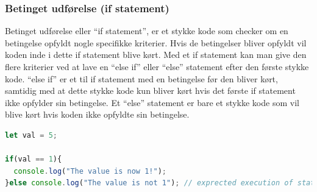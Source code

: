 \documentclass[12pt]{article}
\begin{document}
\subsubsection{Betinget udførelse (if statement)}
Betinget udførelse eller “if statement”, er et stykke kode som checker om en betingelse opfyldt nogle specifikke kriterier. Hvis de betingelser bliver opfyldt vil koden inde i dette if statement blive kørt. Med et if statement kan man give den flere kriterier ved at lave en “else if” eller “else” statement efter den første stykke kode. “else if” er et til if statement med en betingelse før den bliver kørt, samtidig med at dette stykke kode kun bliver kørt hvis det første if statement ikke opfylder sin betingelse. Et “else” statement er bare et stykke kode som vil blive kørt hvis koden ikke opfyldte sin betingelse.
\begin{lstlisting}[language=JavaScript, caption=Eksempel på betinget udførelse]
let val = 5; 

if(val == 1){
  console.log("The value is now 1!");
}else console.log("The value is not 1"); // exprected execution of statement
\end{lstlisting}
\end{document}
